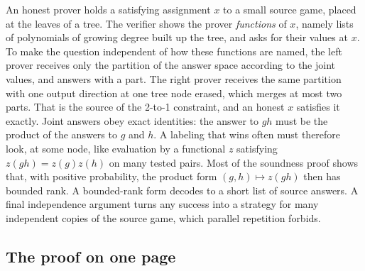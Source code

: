\documentclass[11pt]{article}
\theoremstyle{definition}
\theoremstyle{remark}
\begin{document}
An honest prover holds a satisfying assignment $x$ to a small source game,
placed at the leaves of a tree. The verifier shows the prover \emph{functions}
of $x$, namely lists of polynomials of growing degree built up the tree, and
asks for their values at $x$. To make the question independent of how these
functions are named, the left prover receives only the partition of the
answer space according to the joint values, and answers with a part. The right
prover receives the same partition with one output direction at one tree node
erased, which merges at most two parts. That is the source of the 2-to-1
constraint, and an honest $x$ satisfies it exactly. Joint answers obey exact
identities: the answer to $g h$ must be the product of the answers to $g$ and
$h$. A labeling that wins often must therefore look, at some node, like
evaluation by a functional $z$ satisfying $z(gh)=z(g)z(h)$ on many tested
pairs. Most of the soundness proof shows that, with positive probability, the
product form $(g,h)\mapsto z(gh)$ then has bounded rank. A bounded-rank form
decodes to a short list of source answers. A final independence argument turns any success into a
strategy for many independent copies of the source game, which parallel
repetition forbids.

\subsection{The proof on one page}\label{sec:onepage}
\end{document}

